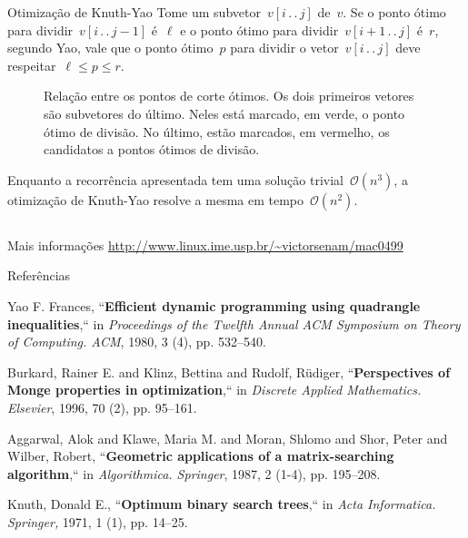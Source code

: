 \documentclass[final]{beamer}
\newcommand{\Cl}[1]{\ensuremath{\mathcal{#1}}}
\newcommand{\tdots}{\,.\,.\,}
\begin{document}
\begin{frame}[t]
\begin{columns}[t]
\begin{column}{0.60\paperwidth}
\begin{columns}[c,totalwidth=0.60\paperwidth]
\begin{column}{0.5\columnwidth}
\begin{block}{Otimização de Knuth-Yao}
Tome um subvetor~$v[i \tdots j]$ de~$v$. Se o ponto ótimo para dividir~$v[i \tdots j-1]$ é~$\ell$ e o ponto ótimo para dividir~$v[i+1 \tdots j]$ é~$r$, segundo Yao, vale que o ponto ótimo~$p$ para dividir o vetor~$v[i \tdots j]$ deve respeitar~$\ell \leq p \leq r$.

\begin{figure}[h]
    \centering
    
    \caption{Relação entre os pontos de corte ótimos. Os dois primeiros vetores são subvetores do último. Neles está marcado, em verde, o ponto ótimo de divisão. No último, estão marcados, em vermelho, os candidatos a pontos ótimos de divisão.}
\end{figure}

Enquanto a recorrência apresentada tem uma solução trivial~$\Cl{O}(n^3)$, a otimização de Knuth-Yao resolve a mesma em tempo~$\Cl{O}(n^2)$.

        \end{block}

    \end{column}

    \end{columns}


	\begin{block}{Mais informações}
		\textcolor{jblue}{{\url{http://www.linux.ime.usp.br/~victorsenam/mac0499}}}
	\end{block}

    \begin{block}{Referências}
        \scriptsize{\begin{thebibliography}{50}
        Yao F. Frances, ``\textbf{Efficient dynamic programming using quadrangle inequalities},`` in \textit{Proceedings of the Twelfth Annual ACM Symposium on Theory of Computing. ACM}, 1980, 3 (4), pp. 532--540.

        Burkard, Rainer E. and Klinz, Bettina and Rudolf, R{\"u}diger, ``\textbf{Perspectives of Monge properties in optimization},`` in \textit{Discrete Applied Mathematics. Elsevier}, 1996, 70 (2), pp. 95--161.

        Aggarwal, Alok and Klawe, Maria M. and Moran, Shlomo and Shor, Peter and Wilber, Robert, ``\textbf{Geometric applications of a matrix-searching algorithm},`` in \textit{Algorithmica. Springer}, 1987, 2 (1-4), pp. 195--208.

        Knuth, Donald E., ``\textbf{Optimum binary search trees},`` in \textit{Acta Informatica. Springer,} 1971, 1 (1), pp. 14--25.


\end{thebibliography}}
\end{block}
\end{column}
\end{columns}
\end{frame}
\end{document}
